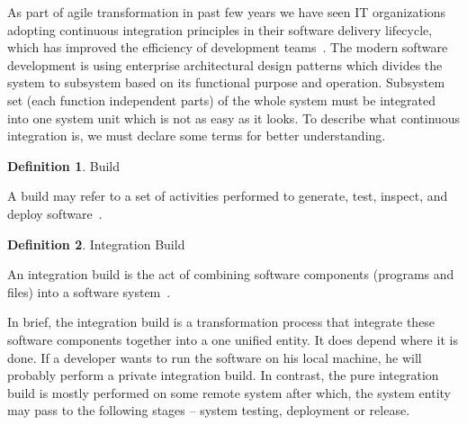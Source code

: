 \documentclass[12pt,a4paper]{article}
\theoremstyle{definition}
\newtheorem{definition}{Definition}[section]
\begin{document}
        As part of agile transformation in past few years we have seen IT organizations adopting continuous integration principles in their software delivery lifecycle, which has improved the efficiency of development teams~\cite{7173368}. The modern software development is using enterprise architectural design patterns which divides the system to subsystem based on its functional purpose and operation. Subsystem set (each function independent parts) of the whole system must be integrated into one system unit which is not as easy as it looks. To describe what continuous integration is, we must declare some terms for better understanding.

        \begin{definition}
            Build\\[-5mm]
            \begin{center}
                \begin{minipage}{0.9\textwidth}
                    A build may refer to a set of activities performed to generate, test, inspect, and deploy software~\cite{ci1}.\\[-2.5mm]
                \end{minipage}
            \end{center}
        \end{definition}

        \begin{definition}
            Integration Build\\[-5mm]
            \begin{center}
                \begin{minipage}{0.9\textwidth}
                    An integration build is the act of combining software components (programs and files) into a software system~\cite{ci1}.\\[-2.5mm]
                \end{minipage}
            \end{center}
        \end{definition}

        In brief, the integration build is a transformation process that integrate these software components together into a one unified entity. It does depend where it is done. If a developer wants to run the software on his local machine, he will probably perform a private integration build. In contrast, the pure integration build is mostly performed on some remote system after which, the system entity may pass to the following stages -- system testing, deployment or release.\\
\end{document}
